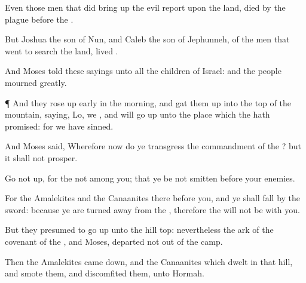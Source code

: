 {Even
those
men that did bring
up the
evil
report upon the
land,
died by the
plague
before the
{}.

But
Joshua the
son of
Nun, and
Caleb the
son of
Jephunneh,
{} of the
men that
went to
search the
land,
lived
{}.

And
Moses
told these
sayings unto all the
children of
Israel: and the
people
mourned
greatly.


\par }{\PP {}¶ And they rose up
early in the
morning, and gat them
up into the
top of the
mountain,
saying,
Lo, we
{}, and will go
up unto the
place which the
{} hath
promised: for we have
sinned.

And
Moses
said, Wherefore now do ye
transgress the
commandment of the
{}? but it shall not
prosper.

Go not
up, for the
{}
{} not
among you; that ye be not
smitten
before your
enemies.

For the
Amalekites and the
Canaanites
{} there
before you, and ye shall
fall by the
sword: because ye are
turned
away from the
{}, therefore the
{} will not be with you.

But they
presumed to go
up unto the
hill
top: nevertheless the
ark of the
covenant of the
{}, and
Moses,
departed not
out of the
camp.

Then the
Amalekites came
down, and the
Canaanites which
dwelt in that
hill, and
smote them, and
discomfited them,
{} unto
Hormah.




\par }
